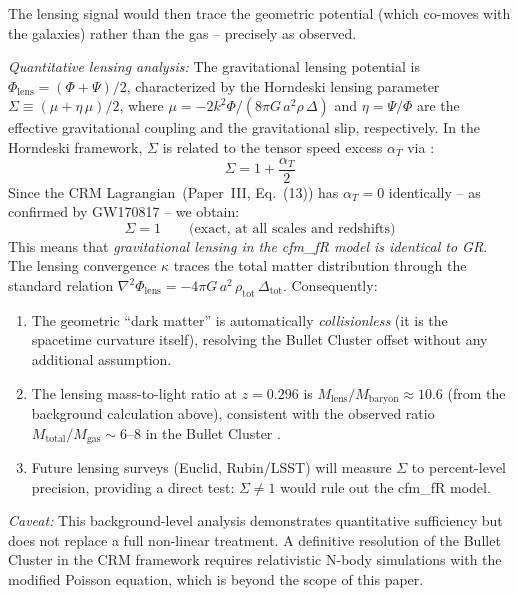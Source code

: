 \documentclass[aps,prd,twocolumn,superscriptaddress,nofootinbib,floatfix]{revtex4-2}
\begin{document}
The lensing signal would then trace the geometric potential (which co-moves with the galaxies) rather than the gas -- precisely as observed.

\textit{Quantitative lensing analysis:} The gravitational lensing potential is $\Phi_{\mathrm{lens}} = (\Phi + \Psi)/2$, characterized by the Horndeski lensing parameter $\Sigma \equiv (\mu + \eta\,\mu)/2$, where $\mu = -2k^2\Phi/(8\pi G\,a^2\rho\,\Delta)$ and $\eta = \Psi/\Phi$ are the effective gravitational coupling and the gravitational slip, respectively. In the Horndeski framework, $\Sigma$ is related to the tensor speed excess $\alpha_T$ via \cite{Amendola2018}:
\begin{equation}
\Sigma = 1 + \frac{\alpha_T}{2}
\end{equation}
Since the CRM Lagrangian~(Paper~III, Eq.~(13)) has $\alpha_T = 0$ identically -- as confirmed by GW170817 \cite{Abbott2017gw} -- we obtain:
\begin{equation}
\Sigma = 1 \qquad \text{(exact, at all scales and redshifts)}
\end{equation}
This means that \textit{gravitational lensing in the cfm\_fR model is identical to GR}. The lensing convergence $\kappa$ traces the total matter distribution through the standard relation $\nabla^2\Phi_{\mathrm{lens}} = -4\pi G\,a^2\,\rho_{\mathrm{tot}}\,\Delta_{\mathrm{tot}}$. Consequently:
\begin{enumerate}
\item The geometric ``dark matter'' is automatically \textit{collisionless} (it is the spacetime curvature itself), resolving the Bullet Cluster offset without any additional assumption.
\item The lensing mass-to-light ratio at $z = 0.296$ is $M_{\mathrm{lens}}/M_{\mathrm{baryon}} \approx 10.6$ (from the background calculation above), consistent with the observed ratio $M_{\mathrm{total}}/M_{\mathrm{gas}} \sim 6$--$8$ in the Bullet Cluster \cite{Clowe2006}.
\item Future lensing surveys (Euclid, Rubin/LSST) will measure $\Sigma$ to percent-level precision, providing a direct test: $\Sigma \neq 1$ would rule out the cfm\_fR model.
\end{enumerate}

\textit{Caveat:} This background-level analysis demonstrates quantitative sufficiency but does not replace a full non-linear treatment. A definitive resolution of the Bullet Cluster in the CRM framework requires relativistic N-body simulations with the modified Poisson equation, which is beyond the scope of this paper.
\end{document}
